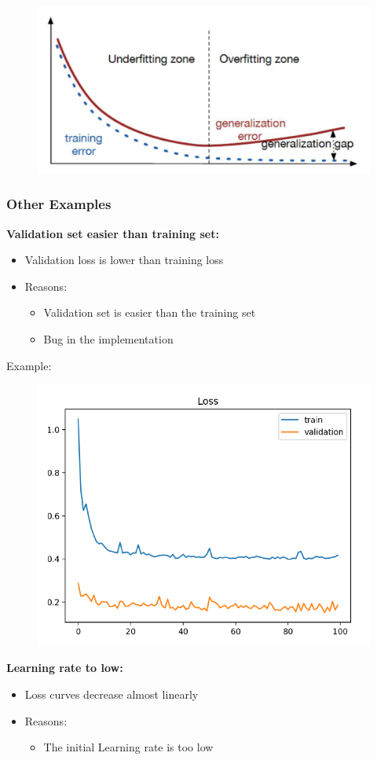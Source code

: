 \documentclass[10pt,a4paper]{article}
\begin{document}
\begin{figure}[H]
	\includegraphics[width=0.7\columnwidth]{figures/graph_underOverfitting.png}
\end{figure}

\subsubsection{Other Examples}
\textbf{Validation set easier than training set:}
\begin{itemize}
	\item Validation loss is lower than training loss
	\item Reasons:
	\begin{itemize}
		\item Validation set is easier than the training set
		\item Bug in the implementation
	\end{itemize}
\end{itemize}

Example:
\begin{figure}[H]
	\includegraphics[width=0.5\columnwidth]{figures/graph_val_easy.png}
\end{figure}

\textbf{Learning rate to low:}
\begin{itemize}
	\item Loss curves decrease almost linearly
	\item Reasons:
	\begin{itemize}
		\item The initial Learning rate is too low
	\end{itemize}
\end{itemize}
\end{document}
